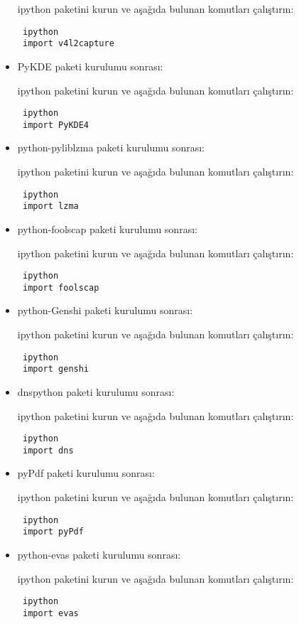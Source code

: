 \documentclass[a4paper,10pt]{article}
\begin{document}
\begin{itemize}
ipython paketini kurun ve aşağıda bulunan komutları çalıştırın:
\begin{verbatim}
 ipython
 import v4l2capture
\end{verbatim}

\item PyKDE paketi kurulumu sonrası:

ipython paketini kurun ve aşağıda bulunan komutları çalıştırın:
\begin{verbatim}
 ipython
 import PyKDE4
\end{verbatim}

\item python-pyliblzma paketi kurulumu sonrası:

ipython paketini kurun ve aşağıda bulunan komutları çalıştırın:
\begin{verbatim}
 ipython
 import lzma
\end{verbatim}

\item python-foolscap paketi kurulumu sonrası:

ipython paketini kurun ve aşağıda bulunan komutları çalıştırın:
\begin{verbatim}
 ipython
 import foolscap
\end{verbatim}

\item python-Genshi paketi kurulumu sonrası:

ipython paketini kurun ve aşağıda bulunan komutları çalıştırın:
\begin{verbatim}
 ipython
 import genshi
\end{verbatim}

\item dnspython paketi kurulumu sonrası:

ipython paketini kurun ve aşağıda bulunan komutları çalıştırın:
\begin{verbatim}
 ipython
 import dns
\end{verbatim}
\item pyPdf paketi kurulumu sonrası:

ipython paketini kurun ve aşağıda bulunan komutları çalıştırın:
\begin{verbatim}
 ipython
 import pyPdf
\end{verbatim}

\item python-evas paketi kurulumu sonrası:

ipython paketini kurun ve aşağıda bulunan komutları çalıştırın:
\begin{verbatim}
 ipython
 import evas
\end{verbatim}


\end{itemize}
\end{document}
